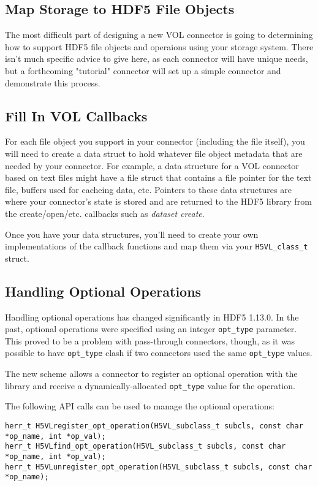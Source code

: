 \subsection{Map Storage to HDF5 File Objects}

The most difficult part of designing a new VOL connector is going to determining
how to support HDF5 file objects and operaions using your storage system.
There isn't much specific advice to give here, as
each connector will have unique needs, but a forthcoming "tutorial" connector
will set up a simple connector and demonstrate this process.


\subsection{Fill In VOL Callbacks}

For each file object you support in your connector (including the file itself),
you will need to create a data struct to hold whatever file object
metadata that are needed by your connector. For example, a data structure for
a VOL connector based on text files might have a file struct that contains a
file pointer for the text file, buffers used for cacheing data, etc. Pointers
to these data structures are where your connector's state is stored and are
returned to the HDF5 library from the create/open/etc. callbacks such as
\textit{dataset create}.

Once you have your data structures, you'll need to create your own
implementations of the callback functions and map them via your
{\tt H5VL\_class\_t} struct.

\subsection{Handling Optional Operations}

Handling optional operations has changed significantly in HDF5 1.13.0. In the
past, optional operations were specified using an integer {\tt opt\_type}
parameter. This proved to be a problem with pass-through connectors, though,
as it was possible to have {\tt opt\_type} clash if two connectors used
the same {\tt opt\_type} values.

The new scheme allows a connector to register an optional operation with
the library and receive a dynamically-allocated {\tt opt\_type} value
for the operation.

The following API calls can be used to manage the optional operations:
\begin{lstlisting}
herr_t H5VLregister_opt_operation(H5VL_subclass_t subcls, const char *op_name, int *op_val);
herr_t H5VLfind_opt_operation(H5VL_subclass_t subcls, const char *op_name, int *op_val);
herr_t H5VLunregister_opt_operation(H5VL_subclass_t subcls, const char *op_name);
\end{lstlisting}

